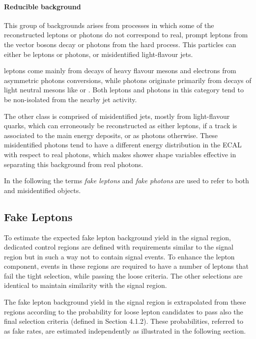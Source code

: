 \paragraph{Reducible background\\}
This group of backgrounds arises from processes in which some of the reconstructed leptons or photons do not correspond to real, prompt leptons from the vector bosons decay or photons from the hard process.
This particles can either be \nonprompt leptons or photons, or misidentified light-flavour jets.

\Nonprompt leptons come mainly from decays of heavy flavour mesons and electrons from asymmetric photons conversions,
while \nonprompt photons originate primarily from decays of light neutral mesons like \PGpz or \PGh.
Both leptons and photons in this category tend to be non-isolated from the nearby jet activity.

The other class is comprised of misidentified jets, mostly from light-flavour quarks, which can erroneously be reconstructed as either leptons,
if a track is associated to the main energy deposits, or as photons otherwise.
These misidentified photons tend to have a different energy distribution in the ECAL with respect to real photons,
which makes shower shape variables effective in separating this background from real photons.

In the following the terms \textit{fake leptons} and \textit{fake photons} are used to refer to both \nonprompt and misidentified objects.


\subsection{Fake Leptons}
To estimate the expected fake lepton background yield in the signal region,
dedicated control regions are defined with requirements similar to the signal region but in such a way not to contain signal events.
To enhance the \nonprompt lepton component, events in these regions are required to
have a number of leptons that fail the tight selection, while passing the loose criteria.
The other selections are identical to maintain similarity with the signal region.

The fake lepton background yield in the signal region is extrapolated from these regions
according to the probability for loose lepton candidates to pass also the final selection criteria (defined in Section 4.1.2).
These probabilities, referred to as fake rates, are estimated independently as illustrated in the following section.

